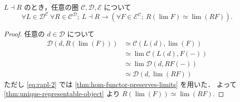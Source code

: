 \documentclass[titlepage]{ltjsreport}
\newcommand{\cat}[1]{\mathscr{#1}}
\newcommand{\objs}[1]{#1}
\newcommand{\mrps}[3]{#1(#2,#3)}
\newcommand{\Fun}[2]{{#2}^{#1}}
\begin{document}
{
  \def\C{\cat{C}}%
  \def\D{\cat{D}}%
  \def\E{\cat{E}}%
  \def\L{L}%
  \def\R{R}%
  \def\F{F}%
  \def\d{d}%
  \begin{theorem}[右随伴は極限を保存する]
    $\L\dashv\R$ のとき，任意の圏 $\C,\D,\E$ について
    \begin{equation}
      \forall\L\in\objs{\Fun{\C}{\D}}\ \forall\R\in\objs{\Fun{\D}{\C}};
      \ \L\dashv\R\rightarrow\left(
      \forall\F\in\objs{\Fun{\C}{\E}};\ \R(\lim{\F})\simeq\lim(\R\F)
      \right).
    \end{equation}
  \end{theorem}
  \begin{proof}
    任意の $\d\in\objs{\D}$ について
    \begin{align}
      \mrps{\D}{\d}{\R(\lim(F))}
       & \simeq\mrps{\C}{\L(\d)}{\lim(F)}                   \\
       & \simeq\lim\mrps{\C}{\L(\d)}{F(-)}\label{eq:rapl-2} \\
       & \simeq\lim\mrps{\D}{\d}{RF(-)}                     \\
       & \simeq\mrps{\D}{\d}{\lim(RF)}
    \end{align}
    ただし \cref{eq:rapl-2} では \cref{thm:hom-functor-preserves-limits}
    を用いた．
    よって \cref{thm:unique-representable-object} より $\R(\lim(F))\simeq\lim(RF)$.
  \end{proof}
}
\end{document}
